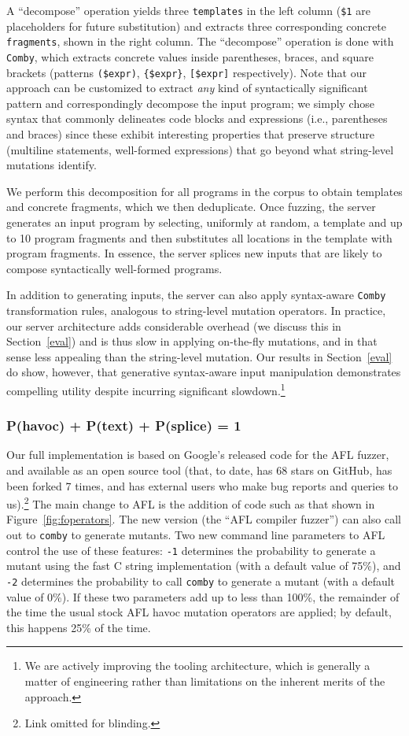 A ``decompose'' operation yields three \texttt{templates} in the left column
({\tt\color{dkgreen}\$1} are placeholders for future substitution) and extracts
three corresponding concrete \texttt{fragments}, shown in the right column. 
The ``decompose'' operation is done with \texttt{Comby}, which extracts concrete
values inside parentheses, braces, and square brackets (patterns
\texttt{(\$expr)}, \texttt{\{\$expr\}}, \texttt{[\$expr]} respectively). Note
that our approach can be customized to extract \emph{any} kind of syntactically
significant pattern and correspondingly decompose the input program; we simply
chose syntax that commonly delineates code blocks and expressions (i.e.,
parentheses and braces) since these exhibit interesting properties that
preserve structure (multiline statements, well-formed expressions) that go
beyond what string-level mutations identify.

We perform this decomposition for all programs in the corpus to obtain
templates and concrete fragments, which we then deduplicate. Once fuzzing, the
server generates an input program by selecting, uniformly at random, a template
and up to 10 program fragments and then substitutes all locations in the
template with program fragments. In essence, the server splices new inputs that
are likely to compose syntactically well-formed programs.

In addition to generating inputs, the server can also apply syntax-aware
\texttt{Comby} transformation rules, analogous to string-level mutation
operators. In practice, our server architecture adds considerable overhead (we
discuss this in Section~\ref{eval}) and is thus slow in applying
on-the-fly mutations, and in that sense less
appealing than the string-level mutation. Our
results in Section~\ref{eval} do show, however, that generative
syntax-aware input manipulation demonstrates compelling utility despite
incurring significant slowdown.\footnote{We are actively improving the tooling
architecture, which is generally a matter of engineering rather than
limitations on the inherent merits of the approach.}

\subsubsection{P(havoc) + P(text) + P(splice) = 1}

Our full implementation is based on Google's released code for the AFL
fuzzer, and available as an open source tool (that, to date, has 68
stars on GitHub, has been forked 7 times, and has external users who
make bug reports and queries to us).\footnote{Link omitted for
  blinding.}  The main change to AFL is the addition of code such as that shown in
Figure~\ref{fig:foperators}.  The new version (the ``AFL compiler
fuzzer'') can also call out to {\tt comby} to generate mutants.  Two
new command line parameters to AFL control the use of these features:
{\tt -1} determines the probability to generate a mutant using the
fast C string implementation (with a default value of 75\%), and {\tt -2} determines the probability
to call {\tt comby} to generate a mutant (with a default value of
0\%).  If these two parameters add up to less than 100\%, the
remainder of the time the usual stock AFL havoc mutation operators are
applied; by default, this happens 25\% of the time.
